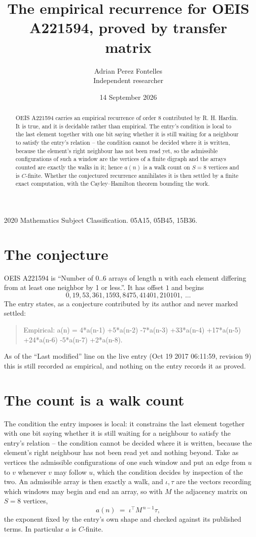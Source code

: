 \documentclass[11pt,a4paper]{article}
\title{The empirical recurrence for OEIS A221594, proved by transfer matrix}
\author{Adrian Perez Fontelles\\ \small Independent researcher}
\date{14 September 2026}
\theoremstyle{plain}
\theoremstyle{definition}
\begin{document}
\maketitle

\begin{abstract}
OEIS A221594 carries an empirical recurrence of order $8$ contributed by R. H. Hardin. It is
true, and it is decidable rather than empirical. The entry's condition is local to the last element together with one bit saying whether it is still waiting for a neighbour to satisfy the entry's relation -- the condition cannot be decided where it is written, because the element's right neighbour has not been read yet, so
the admissible configurations of such a window are the vertices of a finite digraph and the
arrays counted are exactly the walks in it; hence $a(n)$ is a walk count on $S=8$ vertices
and is $C$-finite. Whether the conjectured recurrence annihilates it is then settled by a
finite exact computation, with the Cayley--Hamilton theorem bounding the work.
\end{abstract}

\noindent\small 2020 Mathematics Subject Classification. 05A15, 05B45, 15B36.\normalsize

\section{The conjecture}

OEIS A221594 is ``Number of 0..6 arrays of length n with each element differing from at least one neighbor by 1 or less.''. It has offset $1$ and begins
\[
0, 19, 53, 361, 1593, 8475, 41401, 210101,\ \dots
\]
The entry states, as a conjecture contributed by its author and never marked settled:
\begin{quote}
Empirical: a(n) = 4*a(n-1) +5*a(n-2) -7*a(n-3) +33*a(n-4) +17*a(n-5) +24*a(n-6) -5*a(n-7) +2*a(n-8).
\end{quote}
As of the ``Last modified'' line on the live entry (Oct 19 2017 06:11:59, revision 9) this is still
recorded as empirical, and nothing on the entry records it as proved.

\section{The count is a walk count}

The condition the entry imposes is local: it constrains the last element together with one bit saying whether it is still waiting for a neighbour to satisfy the entry's relation -- the condition cannot be decided where it is written, because the element's right neighbour has not been read yet and nothing beyond. Take as vertices the admissible configurations of one such window and put an edge from $u$ to $v$ whenever $v$ may follow $u$, which the condition decides by inspection of the two.
An admissible array is then exactly a walk, and $\iota,\tau$ are the vectors recording which windows may begin and end an array, so with $M$ the adjacency matrix on $S=8$ vertices,
\[
a(n)\;=\;\iota^{\!\top}M^{\,n-1}\tau ,
\]
the exponent fixed by the entry's own shape and checked against its published terms. In
particular $a$ is $C$-finite.
\end{document}
